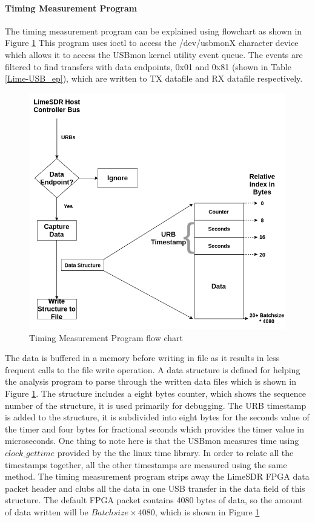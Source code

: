 \paragraph{Timing Measurement Program}
The timing measurement program can be explained using flowchart as shown in Figure \ref{program}
This program uses ioctl to access the /dev/usbmonX character device which allows it to access the USBmon kernel utility event queue.
The events are filtered to find transfers with data endpoints, 0x01 and 0x81 (shown in Table \ref{Lime-USB_ep}), which are written to TX datafile and RX datafile respectively.
 \begin{figure}[h!]
\centering
\includegraphics[scale=0.5]{Thesis/Figure/Program_DataStructure.png}
\caption{Timing Measurement Program flow chart}
\label{program}
\end{figure}
The data is buffered in a memory before writing in file as it results in less frequent calls to the file write operation.
A data structure is defined for helping the analysis program to parse through the written data files which is shown in Figure \ref{program}.
The structure includes a eight bytes counter, which shows the sequence number of the structure, it is used primarily for debugging.
The URB timestamp is added to the structure, it is subdivided into eight bytes for the seconds value of the timer and four bytes for fractional seconds which provides the timer value in microseconds.
One thing to note here is that the USBmon measures time using $clock\_gettime$ provided by the the linux time library.
In order to relate all the timestamps together, all the other timestamps are measured using the same method.
The timing measurement program strips away the LimeSDR FPGA data packet header and clubs all the data in one \ac{USB} transfer in the data field of this structure.
The default FPGA packet contains 4080 bytes of data, so the amount of data written will be $Batchsize \times 4080$, which is shown in Figure \ref{program}

